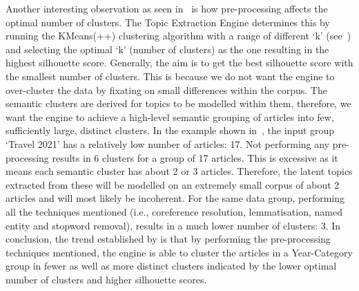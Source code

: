 \vspace*{-1.5em}
Another interesting observation as seen in~ is how pre-processing affects the optimal number of clusters. The Topic Extraction Engine determines this by running the KMeans(++) clustering algorithm with a range of different `k' (see~) and selecting the optimal `k' (number of clusters) as the one resulting in the highest silhouette score. Generally, the aim is to get the best silhouette score with the smallest number of clusters. This is because we do not want the engine to over-cluster the data by fixating on small differences within the corpus. The semantic clusters are derived for topics to be modelled within them, therefore, we want the engine to achieve a high-level semantic grouping of articles into few, sufficiently large, distinct clusters. In the example shown in~, the input group `Travel 2021' has a relatively low number of articles: 17. Not performing any pre-processing results in 6 clusters for a group of 17 articles. This is excessive as it means each semantic cluster has about 2 or 3 articles. Therefore, the latent topics extracted from these will be modelled on an extremely small corpus of about 2 articles and will most likely be incoherent. For the same data group, performing all the techniques mentioned (i.e., coreference resolution, lemmatisation, named entity and stopword removal), results in a much lower number of clusters: 3. In conclusion, the trend established by  is that by performing the pre-processing techniques mentioned, the engine is able to cluster the articles in a Year-Category group in fewer as well as more distinct clusters indicated by the lower optimal number of clusters and higher silhouette scores.


